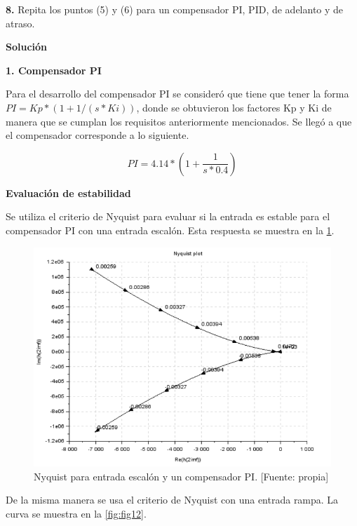 \documentclass[12pt,letterpaper]{article}
\begin{document}
\bigskip

\bigskip

\textbf{8.} Repita los puntos (5) y (6) para un compensador PI, PID, de adelanto y de atraso.\\

\bigskip

\textbf{Solución}

\bigskip

\textbf{1. Compensador PI}

\bigskip

Para el desarrollo del compensador PI se consideró que tiene que tener la forma $PI= Kp*(1+1/(s*Ki))$, donde se obtuvieron los factores Kp y Ki de manera que se cumplan los requisitos anteriormente mencionados. Se llegó a que el compensador corresponde a lo siguiente.

\begin{equation}
    PI = 4.14 * (1+\frac{1}{s*0.4})
\end{equation}


\textbf{Evaluación de estabilidad}

Se utiliza el criterio de Nyquist para evaluar si la entrada es estable para el compensador PI con una entrada escalón. Esta respuesta se muestra en la \ref{fig:fig11}.
\bigskip

\begin{figure}[hbtp]
	\centering
	\includegraphics[width = .7 \columnwidth]{8a.png} 
	\caption[Figura7]{Nyquist para entrada escalón y un compensador PI. [Fuente: propia]} 
	\label{fig:fig11} 
\end{figure}

De la misma manera se usa el criterio de Nyquist con una entrada rampa. La curva se muestra en la \ref{fig:fig12}.
\bigskip
\end{document}
